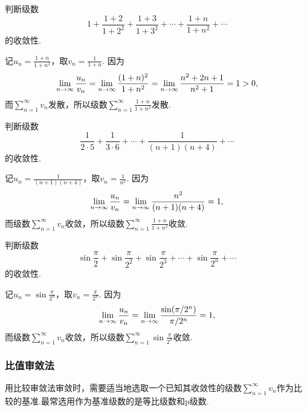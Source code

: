 \begin{example}
判断级数\[
1 + \frac{1+2}{1+2^2} + \frac{1+3}{1+3^2} + \dotsb + \frac{1+n}{1+n^2} + \dotsb
\]的收敛性.
\begin{solution}
记\(u_n = \frac{1+n}{1+n^2}\)，取\(v_n = \frac{1}{1+n}\).
因为\[
\lim\limits_{n\to\infty} \frac{u_n}{v_n}
= \lim\limits_{n\to\infty} \frac{(1+n)^2}{1+n^2}
= \lim\limits_{n\to\infty} \frac{n^2 + 2n + 1}{n^2 + 1}
= 1 > 0,
\]而\(\sum\limits_{n=1}^{\infty} v_n\)发散，所以级数\(\sum\limits_{n=1}^{\infty} \frac{1+n}{1+n^2}\)发散.
\end{solution}
\end{example}

\begin{example}
判断级数\[
\frac{1}{2\cdot5} + \frac{1}{3\cdot6} + \dotsb + \frac{1}{(n+1)(n+4)} + \dotsb
\]的收敛性.
\begin{solution}
记\(u_n = \frac{1}{(n+1)(n+4)}\)，取\(v_n = \frac{1}{n^2}\).
因为\[
\lim\limits_{n\to\infty} \frac{u_n}{v_n} = \lim\limits_{n\to\infty} \frac{n^2}{(n+1)(n+4)} = 1,
\]而级数\(\sum\limits_{n=1}^{\infty} v_n\)收敛，所以级数\(\sum\limits_{n=1}^{\infty} \frac{1+n}{1+n^2}\)收敛.
\end{solution}
\end{example}

\begin{example}
\newcommand\sinfrac[1][]{\sin\frac{\pi}{2^{#1}}}
判断级数\[
\sinfrac + \sinfrac[2] + \sinfrac[3] + \dotsb + \sinfrac[n] + \dotsb
\]的收敛性.
\begin{solution}
记\(u_n = \sin\frac{\pi}{2^n}\)，取\(v_n = \frac{\pi}{2^n}\).
因为\[
\lim\limits_{n\to\infty} \frac{u_n}{v_n}
= \lim\limits_{n\to\infty} \frac{\sin(\pi/2^n)}{\pi/2^n} = 1,
\]而级数\(\sum\limits_{n=1}^{\infty} v_n\)收敛，所以级数\(\sum\limits_{n=1}^{\infty} \sin\frac{\pi}{2^n}\)收敛.
\end{solution}
\end{example}

\subsubsection{比值审敛法}
用比较审敛法审敛时，需要适当地选取一个已知其收敛性的级数\(\sum\limits_{n=1}^{\infty}v_n\)作为比较的基准.最常选用作为基准级数的是等比级数和p级数.

